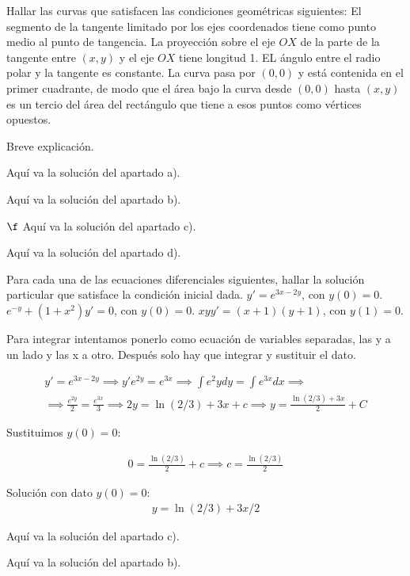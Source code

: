 \documentclass[nochap]{apuntes}
\begin{document}
\begin{problem}[12]
Hallar las curvas que satisfacen las condiciones geométricas siguientes:
\ppart
El segmento de la tangente limitado por los ejes coordenados tiene como punto medio al punto de tangencia.
\ppart
La proyección sobre el eje $OX$ de la parte de la tangente entre $(x,y)$ y el eje $OX$ tiene longitud 1.
\ppart
EL ángulo entre el radio polar y la tangente es constante.
\ppart
La curva pasa por $(0,0)$ y está contenida en el primer cuadrante, de modo que el área bajo la curva desde $(0,0)$ hasta $(x,y)$ es un tercio del área del rectángulo que tiene a esos puntos como vértices opuestos.
\solution

\begin{expla}
Breve explicación.
\end{expla}

\spart
Aquí va la solución del apartado a).

\spart 
Aquí va la solución del apartado b).

\spart
$\f$ Aquí va la solución del apartado c).

\spart 
Aquí va la solución del apartado d).

\end{problem}
\newpage
\begin{problem}[13]
Para cada una de las ecuaciones diferenciales siguientes, hallar la solución particular que satisface la condición inicial dada.
\ppart $y'=e^{3x-2y}$, con $y(0)=0$.
\ppart $e^{-y}+(1+x^2)y'=0$, con $y(0)=0$.
\ppart $xyy'=(x+1)(y+1)$, con $y(1)=0$.

\solution

\begin{expla}
Para integrar intentamos ponerlo como ecuación de variables separadas, las y a un lado y las x a otro. Después solo hay que integrar y sustituir el dato.
\end{expla}
\spart
\begin{gather*}
y'=e^{3x-2y} \implies y'{e^{2y}}=e^{3x} \implies \int{e^2y}dy=\int e^{3x}dx \implies \\ \implies \frac{e^{2y}}{2}=\frac{e^{3x}}{3} \implies 2y=\ln(2/3)+3x+c \implies y=\frac{\ln(2/3)+3x}{2}+C
\end{gather*}

Sustituimos $y(0)=0$:

\begin{gather*}
0=\frac{\ln(2/3)}{2}+c \implies c=\frac{\ln(2/3)}{2}
\end{gather*}

Solución con dato $y(0)=0$:
\begin{gather*}
y=\ln(2/3)+3x/2
\end{gather*}

\spart
Aquí va la solución del apartado c).

\spart
Aquí va la solución del apartado b).

\end{problem}
\end{document}
